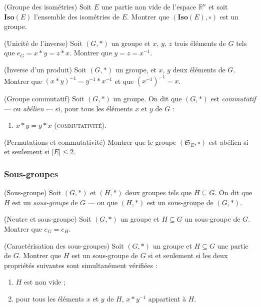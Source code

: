 \begin{exo}(Groupe des isométries)
Soit $E$ une partie non vide de l'espace $\mathbb{R}^n$ et soit $\mathbf{Iso}(E)$ l'ensemble des isométries de $E$.
Montrer que $(\mathbf{Iso}(E), \circ)$ est un groupe.
\end{exo}

\begin{exo}(Unicité de l'inverse)
Soit $(G, \ast)$ un groupe et $x$, $y$, $z$ trois éléments de $G$
tels que $e_G = x \ast y = z \ast x$.
Montrer que $y = z = x^{-1}$.
\end{exo}

\begin{exo}(Inverse d'un produit)
Soit $(G, \ast)$ un groupe, et $x$, $y$ deux éléments de $G$.
Montrer que $(x \ast y)^{-1} = y^{-1} \ast x^{-1}$ et que
$\left(x^{-1}\right)^{-1} = x$.
\end{exo}

\begin{defn}(Groupe commutatif)
Soit $(G, \ast)$ un groupe.
On dit que $(G, \ast)$ est \emph{commutatif} ---
ou \emph{abélien} --- si,
pour tous les éléments $x$ et $y$ de $G$ :
\begin{enumerate}
\item $x \ast y = y \ast x$ (\textsc{commutativité}).
\end{enumerate}
\end{defn}

\begin{exo}(Permutations et commutativité)
Montrer que le groupe $(\mathfrak{S}_E, \circ)$ est abélien
si et seulement si $\vert E \vert \leq 2$.
\end{exo}

\subsubsection{Sous-groupes}

\begin{defn}(Sous-groupe)
Soit $(G, \ast)$ et $(H, \ast)$ deux groupes tels que $H \subseteq G$.
On dit que $H$ est un \emph{sous-groupe} de $G$ ---
ou que $(H, \ast)$ est un sous-groupe de $(G, \ast)$.
\end{defn}

\begin{exo}(Neutre et sous-groupe)
Soit $(G, \ast)$ un groupe et $H \subseteq G$ un sous-groupe de $G$.
Montrer que $e_G = e_H$.
\end{exo}

\begin{exo}(Caractérisation des sous-groupes)
Soit $(G, \ast)$ un groupe et $H \subseteq G$ une partie de $G$.
Montrer que $H$ est un sous-groupe de $G$ si et seulement si
les deux propriétés suivantes sont simultanément vérifiées :
\begin{enumerate}
\item $H$ est non vide ;
\item pour tous les éléments $x$ et $y$ de $H$, $x \ast y^{-1}$ appartient à $H$.
\end{enumerate}
\end{exo}

